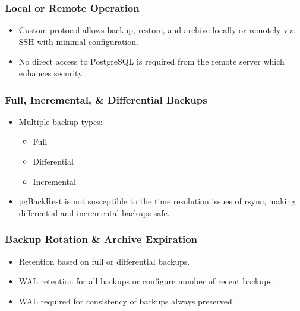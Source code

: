 \begin{frame}
    \frametitle{Local or Remote Operation}

    \begin{itemize}
        \item Custom protocol allows backup, restore, and archive locally or remotely via SSH with minimal configuration.\pause
        \item No direct access to PostgreSQL is required from the remote server which enhances security.
    \end{itemize}
\end{frame}

\begin{frame}
    \frametitle{Full, Incremental, \& Differential Backups}

    \begin{itemize}
        \item Multiple backup types:\pause

            \begin{itemize}
                \item Full\pause
                \item Differential\pause
                \item Incremental\pause
            \end{itemize}

        \item pgBackRest is not susceptible to the time resolution issues of rsync, making differential and incremental backups safe.
    \end{itemize}
\end{frame}

\begin{frame}
    \frametitle{Backup Rotation \& Archive Expiration}

    \begin{itemize}
        \item Retention based on full or differential backups.\pause
        \item WAL retention for all backups or configure number of recent backups.\pause
        \item WAL required for consistency of backups always preserved.
    \end{itemize}
\end{frame}

